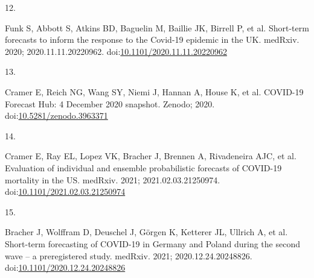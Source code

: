 \documentclass[10pt,letterpaper]{article} %
\newlength{\cslhangindent}
\newlength{\csllabelwidth}
\newlength{\cslentryspacingunit} %
\newenvironment{CSLReferences}[2] %
 {%
  \setlength{\parindent}{0pt}
  \ifodd #1
  \let\oldpar\par
  \def\par{\hangindent=\cslhangindent\oldpar}
  \fi
  \setlength{\parskip}{#2\cslentryspacingunit}
 }%
 {}
\newcommand{\CSLLeftMargin}[1]{\parbox[t]{\csllabelwidth}{#1}}
\newcommand{\CSLRightInline}[1]{\parbox[t]{\linewidth - \csllabelwidth}{#1}\break}
\providecommand{\DIFaddbegin}{} %
\providecommand{\DIFaddend}{} %
\providecommand{\DIFdelbegin}{} %
\providecommand{\DIFdelend}{} %
\newcommand{\DIFscaledelfig}{0.5}
\newlength{\DIFdelgraphicswidth} %
\newlength{\DIFdelgraphicsheight} %
\newcommand{\DIFaddincludegraphics}[2][]{{\color{blue}\fbox{\DIFOincludegraphics[#1]{#2}}}} %
\newcommand{\DIFdelincludegraphics}[2][]{%
\sbox{\DIFdelgraphicsbox}{\DIFOincludegraphics[#1]{#2}}%
\settoboxwidth{\DIFdelgraphicswidth}{\DIFdelgraphicsbox} %
\settoboxtotalheight{\DIFdelgraphicsheight}{\DIFdelgraphicsbox} %
\scalebox{\DIFscaledelfig}{%
\parbox[b]{\DIFdelgraphicswidth}{\usebox{\DIFdelgraphicsbox}\\[-\baselineskip] \rule{\DIFdelgraphicswidth}{0em}}\llap{\resizebox{\DIFdelgraphicswidth}{\DIFdelgraphicsheight}{%
\setlength{\unitlength}{\DIFdelgraphicswidth}%
\begin{picture}(1,1)%
\thicklines\linethickness{2pt} %
{\color[rgb]{1,0,0}\put(0,0){\framebox(1,1){}}}%
{\color[rgb]{1,0,0}\put(0,0){\line( 1,1){1}}}%
{\color[rgb]{1,0,0}\put(0,1){\line(1,-1){1}}}%
\end{picture}%
}\hspace*{3pt}}} %
} %
\DeclareRobustCommand{\DIFaddbegin}{\DIFOaddbegin \let\includegraphics\DIFaddincludegraphics} %
\DeclareRobustCommand{\DIFaddend}{\DIFOaddend \let\includegraphics\DIFOincludegraphics} %
\DeclareRobustCommand{\DIFdelbegin}{\DIFOdelbegin \let\includegraphics\DIFdelincludegraphics} %
\DeclareRobustCommand{\DIFdelend}{\DIFOaddend \let\includegraphics\DIFOincludegraphics} %
\begin{document}
\begin{CSLReferences}{0}{0}
\leavevmode{}%
\CSLLeftMargin{12. }
\DIFdelbegin %
\DIFdelend \DIFaddbegin \CSLRightInline{Funk S, Abbott S, Atkins BD, Baguelin M, Baillie JK,
Birrell P, et al. Short-term forecasts to inform the response to the
{Covid-19} epidemic in the {UK}. medRxiv. 2020; 2020.11.11.20220962.
doi:\href{https://doi.org/10.1101/2020.11.11.20220962}{10.1101/2020.11.11.20220962}}
\DIFaddend 

\leavevmode{}%
\CSLLeftMargin{13. }
\DIFdelbegin %
\DIFdelend \DIFaddbegin \CSLRightInline{Cramer E, Reich NG, Wang SY, Niemi J, Hannan A, House K,
et al. {COVID-19 Forecast Hub}: 4 {December} 2020 snapshot. {Zenodo};
2020.
doi:\href{https://doi.org/10.5281/zenodo.3963371}{10.5281/zenodo.3963371}}
\DIFaddend 

\leavevmode{}%
\CSLLeftMargin{14. }
\DIFdelbegin %
\DIFdelend \DIFaddbegin \CSLRightInline{Cramer E, Ray EL, Lopez VK, Bracher J, Brennen A,
Rivadeneira AJC, et al. Evaluation of individual and ensemble
probabilistic forecasts of {COVID-19} mortality in the {US}. medRxiv.
2021; 2021.02.03.21250974.
doi:\href{https://doi.org/10.1101/2021.02.03.21250974}{10.1101/2021.02.03.21250974}}
\DIFaddend 

\leavevmode{}%
\CSLLeftMargin{15. }
\DIFdelbegin %
\DIFdelend \DIFaddbegin \CSLRightInline{Bracher J, Wolffram D, Deuschel J, Görgen K, Ketterer
JL, Ullrich A, et al. Short-term forecasting of {COVID-19} in {Germany}
and {Poland} during the second wave -- a preregistered study. medRxiv.
2021; 2020.12.24.20248826.
doi:\href{https://doi.org/10.1101/2020.12.24.20248826}{10.1101/2020.12.24.20248826}}
\DIFaddend 


\end{CSLReferences}
\end{document}
